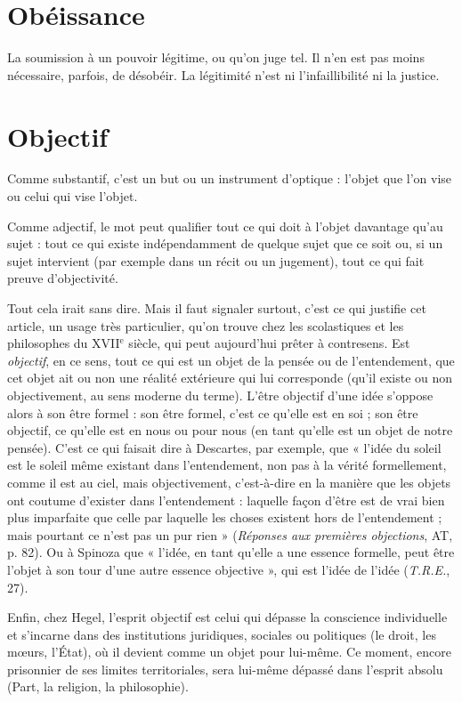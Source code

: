 \section{Obéissance}
La soumission à un pouvoir légitime, ou qu’on juge tel. Il
n’en est pas moins nécessaire, parfois, de désobéir. La légitimité
n’est ni l’infaillibilité ni la justice.

\section{Objectif}
Comme substantif, c’est un but ou un instrument d'optique :
l’objet que l’on vise ou celui qui vise l’objet.

Comme adjectif, le mot peut qualifier tout ce qui doit à l’objet davantage
qu'au sujet : tout ce qui existe indépendamment de quelque sujet que ce soit
ou, si un sujet intervient (par exemple dans un récit ou un jugement), tout ce
qui fait preuve d’objectivité.

Tout cela irait sans dire. Mais il faut signaler surtout, c’est ce qui justifie cet
article, un usage très particulier, qu’on trouve chez les scolastiques et les philosophes
du {\footnotesize XVII$^\text{e}$} siècle, qui peut aujourd’hui prêter à contresens. Est {\it objectif}, en
ce sens, tout ce qui est un objet de la pensée ou de l’entendement, que cet objet
ait ou non une réalité extérieure qui lui corresponde (qu’il existe ou non objectivement,
au sens moderne du terme). L’être objectif d’une idée s’oppose alors
à son être formel : son être formel, c’est ce qu’elle est en soi ; son être objectif,
ce qu’elle est en nous ou pour nous (en tant qu’elle est un objet de notre
pensée). C’est ce qui faisait dire à Descartes, par exemple, que « l’idée du soleil
est le soleil même existant dans l’entendement, non pas à la vérité formellement,
comme il est au ciel, mais objectivement, c’est-à-dire en la manière que
les objets ont coutume d’exister dans l’entendement : laquelle façon d’être est
de vrai bien plus imparfaite que celle par laquelle les choses existent hors de
l’entendement ; mais pourtant ce n’est pas un pur rien » ({\it Réponses aux premières
objections}, AT, p. 82). Ou à Spinoza que « l’idée, en tant qu’elle a une essence
formelle, peut être l’objet à son tour d’une autre essence objective », qui est
l'idée de l’idée ({\it T.R.E.}, 27).

Enfin, chez Hegel, l'esprit objectif est celui qui dépasse la conscience individuelle et
s’incarne dans des institutions juridiques, sociales ou politiques (le
droit, les mœurs, l’État), où il devient comme un objet pour lui-même. Ce
moment, encore prisonnier de ses limites territoriales, sera lui-même dépassé
dans l’esprit absolu (Part, la religion, la philosophie).

